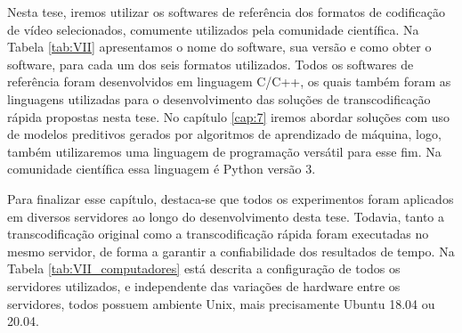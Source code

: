 Nesta tese, iremos utilizar os softwares de referência dos formatos de codificação de vídeo selecionados, comumente utilizados pela comunidade científica. Na Tabela \ref{tab:VII} apresentamos o nome do software, sua versão e como obter o software, para cada um dos seis formatos utilizados. Todos os softwares de referência foram desenvolvidos em linguagem C/C++, os quais também foram as linguagens utilizadas para o desenvolvimento das soluções de transcodificação rápida propostas nesta tese. No capítulo \ref{cap:7} iremos abordar soluções com uso de modelos preditivos gerados por algoritmos de aprendizado de máquina, logo, também utilizaremos uma linguagem de programação versátil para esse fim. Na comunidade científica essa linguagem é Python versão 3. 



Para finalizar esse capítulo, destaca-se que todos os experimentos foram aplicados em diversos servidores ao longo do desenvolvimento desta tese. Todavia, tanto a transcodificação original como a transcodificação rápida foram executadas no mesmo servidor, de forma a garantir a confiabilidade dos resultados de tempo. Na Tabela \ref{tab:VII_computadores} está descrita a configuração de todos os servidores utilizados, e independente das variações de hardware entre os servidores, todos possuem ambiente Unix, mais precisamente Ubuntu 18.04 ou 20.04.




